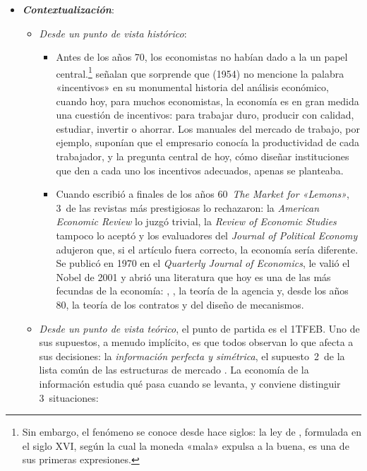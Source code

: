 \documentclass[11pt]{article}
\begin{document}
\begin{itemize}
\item \textbf{\emph{Contextualización}}:
  \begin{itemize}
  \item \emph{Desde un punto de vista histórico}:
    \begin{itemize}
    \item Antes de los años 70, los economistas no habían dado a la  un papel central.\footnote{Sin embargo, el fenómeno se conoce desde hace siglos: la ley de , formulada en el siglo XVI, según la cual la moneda «mala» expulsa a la buena, es una de sus primeras expresiones.} \textcite{LaffontMartimort2002Theory} señalan que sorprende que  (1954) no mencione la palabra «incentivos» en su monumental historia del análisis económico, cuando hoy, para muchos economistas, la economía es en gran medida una cuestión de incentivos: para trabajar duro, producir con calidad, estudiar, invertir o ahorrar. Los manuales del mercado de trabajo, por ejemplo, suponían que el empresario conocía la productividad de cada trabajador\nocite{Economist2016SixBigIdeas}, y la pregunta central de hoy, cómo diseñar instituciones que den a cada uno los incentivos adecuados, apenas se planteaba.
    \item Cuando  escribió a finales de los años 60~\emph{The Market for «Lemons»}, 3~de las revistas más prestigiosas lo rechazaron: la \emph{American Economic Review} lo juzgó trivial, la \emph{Review of Economic Studies} tampoco lo aceptó y los evaluadores del \emph{Journal of Political Economy} adujeron que, si el artículo fuera correcto, la economía sería diferente\nocite{Akerlof2001Writing}. Se publicó en 1970 en el \emph{Quarterly Journal of Economics}\nocite{Akerlof1970Market}, le valió el Nobel de 2001 y abrió una literatura que hoy es una de las más fecundas de la economía: \textcite{Spence1973Job}, \textcite{RothschildStiglitz1976Equilibrium}, la teoría de la agencia\nocite{Ross1973Economic,Holmstrom1979Moral} y, desde los años 80, la teoría de los contratos y del diseño de mecanismos.
    \end{itemize}
  \item \emph{Desde un punto de vista teórico}, el punto de partida es el 1TFEB. Uno de sus supuestos, a menudo implícito, es que todos observan lo que afecta a sus decisiones: la \emph{información perfecta y simétrica}, el supuesto~2~de la lista común de las estructuras de mercado . La economía de la información estudia qué pasa cuando se levanta, y conviene distinguir 3~situaciones:

\end{itemize}
\end{itemize}
\end{document}
